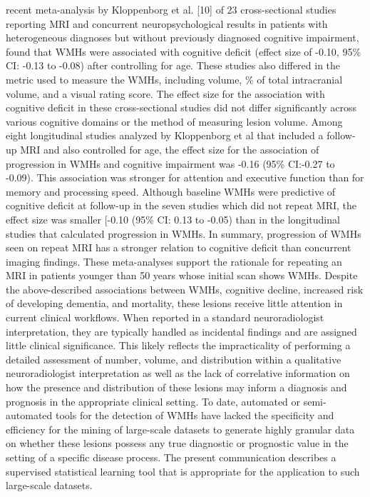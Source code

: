 \documentclass[11pt,]{article}
\begin{document}
 recent meta-analysis by Kloppenborg et al.
{[}10{]} of 23 cross-sectional studies reporting MRI and concurrent
neuropsychological results in patients with heterogeneous diagnoses but
without previously diagnosed cognitive impairment, found that WMHs were
associated with cognitive deficit (effect size of -0.10, 95\% CI: -0.13
to -0.08) after controlling for age. These studies also differed in the
metric used to measure the WMHs, including volume, \% of total
intracranial volume, and a visual rating score. The effect size for the
association with cognitive deficit in these cross-sectional studies did
not differ significantly across various cognitive domains or the method
of measuring lesion volume. Among eight longitudinal studies analyzed by
Kloppenborg et al that included a follow-up MRI and also controlled for
age, the effect size for the association of progression in WMHs and
cognitive impairment was -0.16 (95\% CI:-0.27 to -0.09). This
association was stronger for attention and executive function than for
memory and processing speed. Although baseline WMHs were predictive of
cognitive deficit at follow-up in the seven studies which did not repeat
MRI, the effect size was smaller {[}-0.10 (95\% CI: 0.13 to -0.05) than
in the longitudinal studies that calculated progression in WMHs. In
summary, progression of WMHs seen on repeat MRI has a stronger relation
to cognitive deficit than concurrent imaging findings. These
meta-analyses support the rationale for repeating an MRI in patients
younger than 50 years whose initial scan shows WMHs. Despite the
above-described associations between WMHs, cognitive decline, increased
risk of developing dementia, and mortality, these lesions receive little
attention in current clinical workflows. When reported in a standard
neuroradiologist interpretation, they are typically handled as
incidental findings and are assigned little clinical significance. This
likely reflects the impracticality of performing a detailed assessment
of number, volume, and distribution within a qualitative
neuroradiologist interpretation as well as the lack of correlative
information on how the presence and distribution of these lesions may
inform a diagnosis and prognosis in the appropriate clinical setting. To
date, automated or semi-automated tools for the detection of WMHs have
lacked the specificity and efficiency for the mining of large-scale
datasets to generate highly granular data on whether these lesions
possess any true diagnostic or prognostic value in the setting of a
specific disease process. The present communication describes a
supervised statistical learning tool that is appropriate for the
application to such large-scale datasets.
\end{document}
